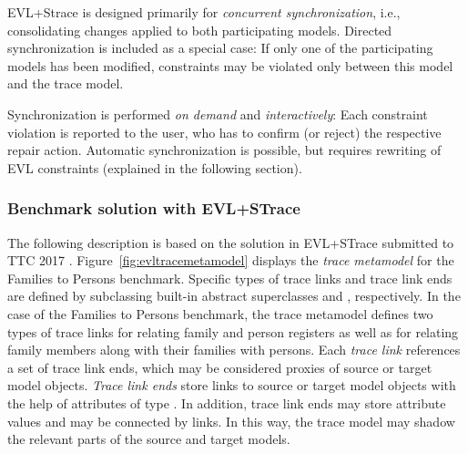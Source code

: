 EVL+Strace is designed primarily for \emph{concurrent synchronization}, i.e., consolidating  changes applied to both participating models.
Directed synchronization is included as a special case: If only one of the participating models has been modified, constraints may be violated only between this model and the trace model.

Synchronization is performed \emph{on demand} and \emph{interactively}: Each constraint violation is reported to the user, who has to confirm (or reject) the respective repair action.
Automatic synchronization is possible, but requires rewriting of EVL constraints (explained in the following section).

\subsubsection{Benchmark solution with EVL+STrace}
\label{sec:solutionEVL}

The following description is based on the solution in EVL+STrace submitted to TTC 2017 \cite{Samimi-Dehkordi2017}.
Figure~\ref{fig:evltracemetamodel} displays the \emph{trace metamodel} for the Families to Persons benchmark. Specific types of trace links and trace link ends are defined by subclassing built-in abstract superclasses  and , respectively. In the case of the Families to Persons benchmark, the trace metamodel defines two types of trace links for relating family and person registers as well as for relating family members along with their families with persons. Each \emph{trace link} references a set of trace link ends, which may be considered proxies of source or target model objects. \emph{Trace link ends} store links to source or target model objects with the help of attributes of type . In addition, trace link ends may store attribute values and may be connected by links. In this way, the trace model may shadow the relevant parts of the source and target models. 


 



